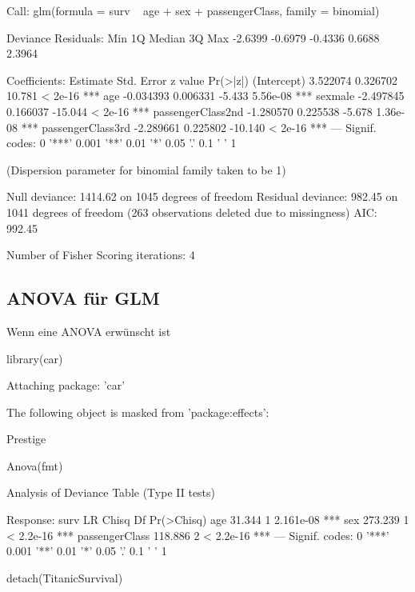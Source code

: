 \documentclass[a4paper,twoside]{tufte-book}\usepackage[]{graphicx}\usepackage[]{color}
\begin{document}
\begin{appendices}
\begin{Schunk}
\begin{Soutput}
Call:
glm(formula = surv ~ age + sex + passengerClass, family = binomial)

Deviance Residuals: 
    Min       1Q   Median       3Q      Max  
-2.6399  -0.6979  -0.4336   0.6688   2.3964  

Coefficients:
                   Estimate Std. Error z value Pr(>|z|)    
(Intercept)        3.522074   0.326702  10.781  < 2e-16 ***
age               -0.034393   0.006331  -5.433 5.56e-08 ***
sexmale           -2.497845   0.166037 -15.044  < 2e-16 ***
passengerClass2nd -1.280570   0.225538  -5.678 1.36e-08 ***
passengerClass3rd -2.289661   0.225802 -10.140  < 2e-16 ***
---
Signif. codes:  0 '***' 0.001 '**' 0.01 '*' 0.05 '.' 0.1 ' ' 1

(Dispersion parameter for binomial family taken to be 1)

    Null deviance: 1414.62  on 1045  degrees of freedom
Residual deviance:  982.45  on 1041  degrees of freedom
  (263 observations deleted due to missingness)
AIC: 992.45

Number of Fisher Scoring iterations: 4
\end{Soutput}
\end{Schunk}

\subsection{ANOVA für GLM}

Wenn eine ANOVA erwünscht ist


\begin{Schunk}
\begin{Sinput}
library(car)
\end{Sinput}
\begin{Soutput}

Attaching package: 'car'
\end{Soutput}
\begin{Soutput}
The following object is masked from 'package:effects':

    Prestige
\end{Soutput}
\begin{Sinput}
Anova(fmt)
\end{Sinput}
\begin{Soutput}
Analysis of Deviance Table (Type II tests)

Response: surv
               LR Chisq Df Pr(>Chisq)    
age              31.344  1  2.161e-08 ***
sex             273.239  1  < 2.2e-16 ***
passengerClass  118.886  2  < 2.2e-16 ***
---
Signif. codes:  0 '***' 0.001 '**' 0.01 '*' 0.05 '.' 0.1 ' ' 1
\end{Soutput}
\begin{Sinput}
detach(TitanicSurvival)
\end{Sinput}
\end{Schunk}


\end{appendices}
\end{document}

